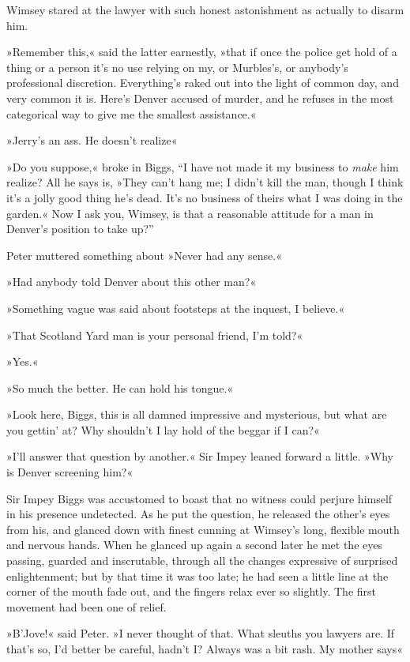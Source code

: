 Wimsey stared at the lawyer with such honest astonishment as actually to disarm him.

»Remember this,« said the latter earnestly, »that if once the police get hold of a thing or a person it's no use relying on my, or Murbles's, or anybody's professional discretion. Everything's raked out into the light of common day, and very common it is. Here's Denver accused of murder, and he refuses in the most categorical way to give me the smallest assistance.«

»Jerry's an ass. He doesn't realize\longdash«

»Do you suppose,« broke in Biggs, \enquote{I have not made it my business to \textit{make} him realize? All he says is, »They can't hang me; I didn't kill the man, though I think it's a jolly good thing he's dead. It's no business of theirs what I was doing in the garden.« Now I ask you, Wimsey, is that a reasonable attitude for a man in Denver's position to take up?}

Peter muttered something about »Never had any sense.«

»Had anybody told Denver about this other man?«

»Something vague was said about footsteps at the inquest, I believe.«

»That Scotland Yard man is your personal friend, I'm told?«

»Yes.«

»So much the better. He can hold his tongue.«

»Look here, Biggs, this is all damned impressive and mysterious, but what are you gettin' at? Why shouldn't I lay hold of the beggar if I can?«

»I'll answer that question by another.« Sir Impey leaned forward a little. »Why is Denver screening him?«

Sir Impey Biggs was accustomed to boast that no witness could perjure himself in his presence undetected. As he put the question, he released the other's eyes from his, and glanced down with finest cunning at Wimsey's long, flexible mouth and nervous hands. When he glanced up again a second later he met the eyes passing, guarded and inscrutable, through all the changes expressive of surprised enlightenment; but by that time it was too late; he had seen a little line at the corner of the mouth fade out, and the fingers relax ever so slightly. The first movement had been one of relief.

»B'Jove!« said Peter. »I never thought of that. What sleuths you lawyers are. If that's so, I'd better be careful, hadn't I? Always was a bit rash. My mother says\longdash«

